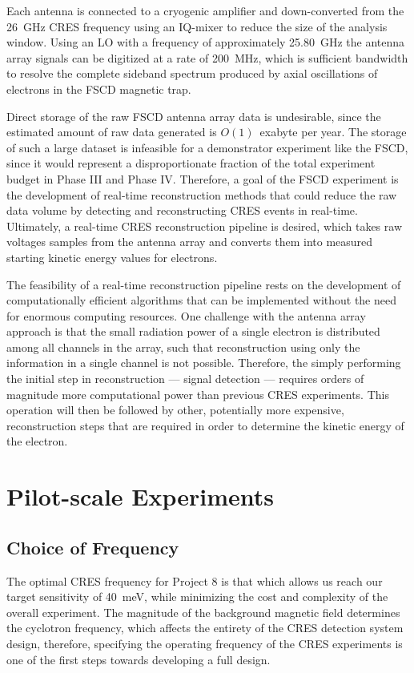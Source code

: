 Each antenna is connected to a cryogenic amplifier and down-converted from the 26~GHz CRES frequency using an IQ-mixer to reduce the size of the analysis window. Using an LO with a frequency of approximately 25.80~GHz the antenna array signals can be digitized at a rate of 200~MHz, which is sufficient bandwidth to resolve the complete sideband spectrum produced by axial oscillations of electrons in the FSCD magnetic trap. 

Direct storage of the raw FSCD antenna array data is undesirable, since the estimated amount of raw data generated is $O(1)$~exabyte per year. The storage of such a large dataset is infeasible for a demonstrator experiment like the FSCD, since it would represent a disproportionate fraction of the total experiment budget in Phase III and Phase IV. Therefore, a goal of the FSCD experiment is the development of real-time reconstruction methods that could reduce the raw data volume by detecting and reconstructing CRES events in real-time. Ultimately, a real-time CRES reconstruction pipeline is desired, which takes raw voltages samples from the antenna array and converts them into measured starting kinetic energy values for electrons.

The feasibility of a real-time reconstruction pipeline rests on the development of computationally efficient algorithms that can be implemented without the need for enormous computing resources. One challenge with the antenna array approach is that the small radiation power of a single electron is distributed among all channels in the array, such that reconstruction using only the information in a single channel is not possible. Therefore, the simply performing the initial step in reconstruction --- signal detection --- requires orders of magnitude more computational power than previous CRES experiments. This operation will then be followed by other, potentially more expensive, reconstruction steps that are required in order to determine the kinetic energy of the electron.

\section{Pilot-scale Experiments}
\label{sec:chap3-freq-choice-and-pilot-scale}

\subsection{Choice of Frequency}
The optimal CRES frequency for Project 8 is that which allows us reach our target sensitivity of 40~meV, while minimizing the cost and complexity of the overall experiment. The magnitude of the background magnetic field determines the cyclotron frequency, which affects the entirety of the CRES detection system design, therefore, specifying the operating frequency of the CRES experiments is one of the first steps towards developing a full design.


